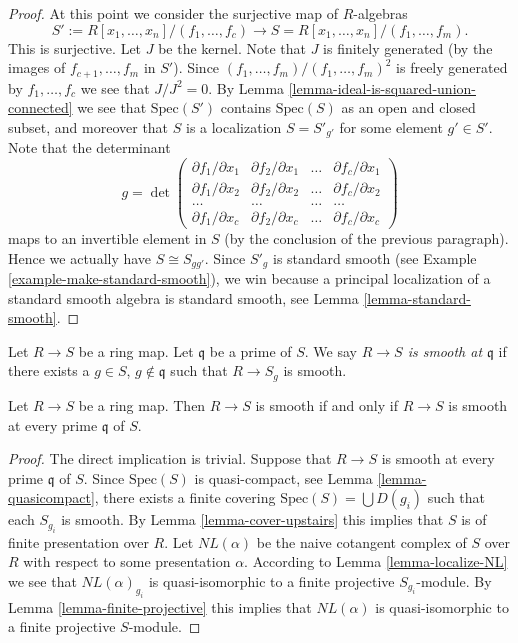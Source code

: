 \begin{proof}
\medskip\noindent
At this point we consider the surjective map of $R$-algebras
$$
S' := R[x_1, \ldots, x_n]/(f_1, \ldots, f_c)
\longrightarrow
S = R[x_1, \ldots, x_n]/(f_1, \ldots, f_m).
$$
This is surjective. Let $J$ be the kernel. Note that
$J$ is finitely generated (by the images of $f_{c + 1}, \ldots, f_m$
in $S'$). Since $(f_1, \ldots, f_m)/(f_1, \ldots, f_m)^2$ is freely
generated by $f_1, \ldots, f_c$ we see that $J/J^2 = 0$.
By Lemma \ref{lemma-ideal-is-squared-union-connected}
we see that $\text{Spec}(S')$ contains $\text{Spec}(S)$
as an open and closed subset, and moreover that $S$ is a localization
$S = S'_{g'}$ for some element $g' \in S'$. Note that the determinant
$$
g =
\det 
\left(
\begin{matrix}
\partial f_1/\partial x_1 & 
\partial f_2/\partial x_1 & 
\ldots &
\partial f_c/\partial x_1 \\
\partial f_1/\partial x_2 & 
\partial f_2/\partial x_2 & 
\ldots &
\partial f_c/\partial x_2 \\
\ldots & \ldots & \ldots & \ldots \\
\partial f_1/\partial x_c & 
\partial f_2/\partial x_c & 
\ldots &
\partial f_c/\partial x_c
\end{matrix}
\right)
$$
maps to an invertible element in $S$ (by the conclusion of the
previous paragraph). Hence
we actually have $S \cong S_{gg'}$. Since
$S'_g$ is standard smooth (see Example \ref{example-make-standard-smooth}),
we win because a principal localization of a standard smooth
algebra is standard smooth, see Lemma \ref{lemma-standard-smooth}.
\end{proof}

\begin{definition}
\label{definition-smooth-at-prime}
Let $R \to S$ be a ring map.
Let $\mathfrak q$ be a prime of $S$.
We say {\it $R \to S$ is smooth at $\mathfrak q$} if there
exists a $g \in S$, $g \not \in \mathfrak q$ such
that $R \to S_g$ is smooth.
\end{definition}

\begin{lemma}
\label{lemma-locally-smooth}
Let $R \to S$ be a ring map.
Then $R \to S$ is smooth if and only if $R \to S$ is smooth
at every prime $\mathfrak q$ of $S$.
\end{lemma}

\begin{proof}
The direct implication is trivial. Suppose that $R \to S$ is smooth
at every prime $\mathfrak q$ of $S$. Since $\text{Spec}(S)$ is
quasi-compact, see Lemma \ref{lemma-quasicompact},
there exists a finite covering
$\text{Spec}(S) = \bigcup D(g_i)$ such that each $S_{g_i}$ is
smooth. By Lemma \ref{lemma-cover-upstairs} this implies that
$S$ is of finite presentation over $R$. Let $NL(\alpha)$ be
the naive cotangent complex of $S$ over $R$ with respect to some
presentation $\alpha$. According to Lemma \ref{lemma-localize-NL}
we see that
$NL(\alpha)_{g_i}$ is quasi-isomorphic to a finite projective
$S_{g_i}$-module. By Lemma \ref{lemma-finite-projective}
this implies that $NL(\alpha)$ is quasi-isomorphic to a finite
projective $S$-module.
\end{proof}


